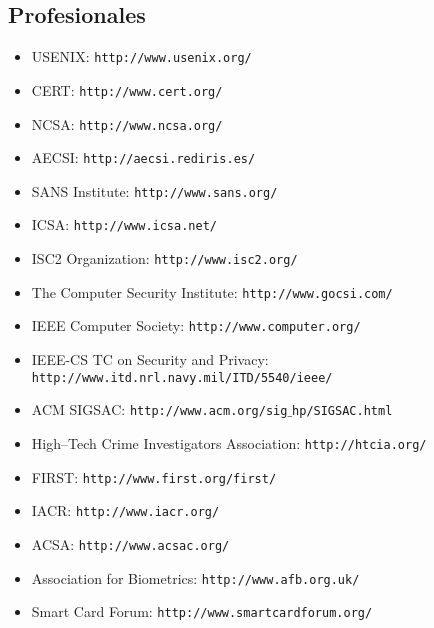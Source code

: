 \subsection{Profesionales}
\begin{itemize}
\item USENIX: {\tt http://www.usenix.org/}
\item CERT: {\tt http://www.cert.org/}
\item NCSA: {\tt http://www.ncsa.org/}
\item AECSI: {\tt http://aecsi.rediris.es/}
\item SANS Institute: {\tt http://www.sans.org/}
\item ICSA: {\tt http://www.icsa.net/}
\item ISC2 Organization: {\tt http://www.isc2.org/}
\item The Computer Security Institute: {\tt http://www.gocsi.com/}
\item IEEE Computer Society: {\tt http://www.computer.org/}
\item IEEE-CS TC on Security and Privacy: {\tt http://www.itd.nrl.navy.mil/ITD/5540/ieee/}
\item ACM SIGSAC: {\tt http://www.acm.org/sig$\_$hp/SIGSAC.html}
\item High--Tech Crime Investigators Association: {\tt http://htcia.org/}
\item FIRST: {\tt http://www.first.org/first/}
\item IACR: {\tt http://www.iacr.org/}
\item ACSA: {\tt http://www.acsac.org/}
\item Association for Biometrics: {\tt http://www.afb.org.uk/}
\item Smart Card Forum: {\tt http://www.smartcardforum.org/}
\end{itemize}
